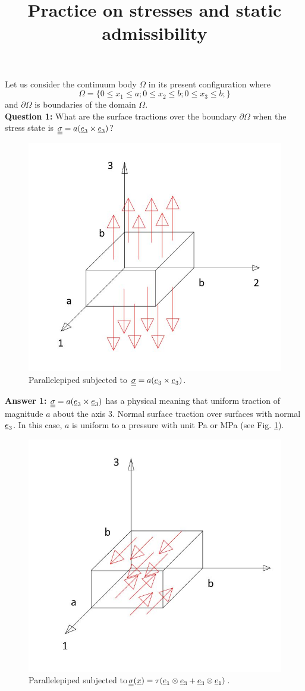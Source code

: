\documentclass[letter,12pt]{article}
\begin{document}
\pagestyle{fancy}

\title{\textbf{Practice on stresses and static admissibility}}
\date{}

\maketitle

\vspace{-1cm}

Let us consider the continuum body $\Omega$ in its present configuration where 
\begin{equation}
\Omega = \{ 0 \le x_1 \le a; 0 \le x_2 \le b; 0 \le x_3\le b;\}
\end{equation}
and $\partial \Omega$ is boundaries of the domain $\Omega$. \\

\noindent \textbf{Question 1:} What are the surface tractions over the boundary $\partial \Omega$ when the stress state is $\underline{\underline{\sigma}} = a (\underline{e}_3 \times \underline{e}_3)$? \\

\begin{figure}[ht]
	\centering
	\includegraphics[width=0.4\linewidth]{figures/p1}
	\caption{Parallelepiped subjected to $\underline{\underline{\sigma}} = a (\underline{e}_3 \times \underline{e}_3)$.}
	\label{fig:replacewithrealfigure}
\end{figure}


\noindent \textbf{Answer 1:} $\underline{\underline{\sigma}} = a (\underline{e}_3 \times \underline{e}_3)$ has a physical meaning that uniform traction of magnitude $a$ about the axis $3$. Normal surface traction over surfaces with normal $\underline{e}_3$. In this case, $a$ is uniform to a pressure with unit Pa or MPa (see Fig. \ref{fig:replacewithrealfigure}).\\

\begin{figure}[ht!]
	\centering
	\includegraphics[width=0.4\linewidth]{figures/p2}
	\caption{Parallelepiped subjected to$\underline{\underline{\sigma}} (\underline{x}) = \tau (\underline{e}_1 \otimes \underline{e}_3 + \underline{e}_3 \otimes \underline{e}_1 )$.}
	\label{fig:replacewithrealfigure2}
\end{figure}
\end{document}
